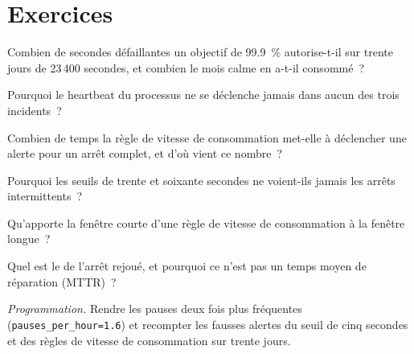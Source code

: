 \section{Exercices}

\begin{exercise}[$\star$]\label{exo:pl:observability-and-incident-response:1}
Combien de secondes défaillantes un objectif de 99.9~\% autorise-t-il sur trente jours de 23\,400 secondes, et combien le mois calme en a-t-il consommé~?
\end{exercise}

\begin{exercise}[$\star$]\label{exo:pl:observability-and-incident-response:2}
Pourquoi le heartbeat du processus ne se déclenche jamais dans aucun des trois incidents~?
\end{exercise}

\begin{exercise}[$\star$]\label{exo:pl:observability-and-incident-response:3}
Combien de temps la règle de vitesse de consommation met-elle à déclencher une alerte pour un arrêt complet, et d'où vient ce nombre~?
\end{exercise}

\begin{exercise}[$\star\star$]\label{exo:pl:observability-and-incident-response:4}
Pourquoi les seuils de trente et soixante secondes ne voient-ils jamais les arrêts intermittents~?
\end{exercise}

\begin{exercise}[$\star\star$]\label{exo:pl:observability-and-incident-response:5}
Qu'apporte la fenêtre courte d'une règle de vitesse de consommation à la fenêtre longue~?
\end{exercise}

\begin{exercise}[$\star\star$]\label{exo:pl:observability-and-incident-response:6}
Quel est le  de l'arrêt rejoué, et pourquoi ce n'est pas un temps moyen de réparation (MTTR)~?
\end{exercise}

\begin{exercise}[$\star\star\star$]\label{exo:pl:observability-and-incident-response:7}
\emph{Programmation.} Rendre les pauses deux fois plus fréquentes (\texttt{pauses\_per\_hour=1.6}) et recompter les fausses alertes du seuil de cinq secondes et
des règles de vitesse de consommation sur trente jours.
\end{exercise}

